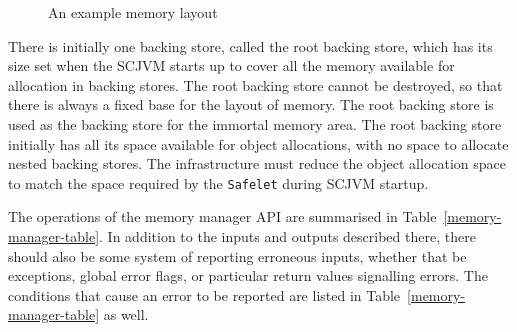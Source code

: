 \begin{figure*}[ht]
  \caption{An example memory layout}
  \label{memory-fig}
\end{figure*}

There is initially one backing store, called the root backing store,
which has its size set when the SCJVM starts up to cover all the
memory available for allocation in backing stores.
The root backing store cannot be destroyed, so that there is always a
fixed base for the layout of memory.
The root backing store is used as the backing store for the immortal
memory area.
The root backing store initially has all its space available for
object allocations, with no space to allocate nested backing stores.
The infrastructure must reduce the object allocation space to match
the space required by the \texttt{Safelet} during SCJVM startup.

The operations of the memory manager API are summarised in
Table~\ref{memory-manager-table}.
In addition to the inputs and outputs described there, there should
also be some system of reporting erroneous inputs, whether that be
exceptions, global error flags, or particular return values signalling
errors.
The conditions that cause an error to be reported are listed in
Table~\ref{memory-manager-table} as well.

